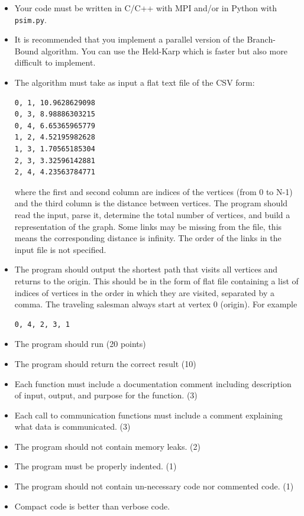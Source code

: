 \documentclass[12pt]{article}
\begin{document}
\begin{itemize}
\item Your code must be written in C/C++ with MPI and/or in Python
  with {\tt psim.py}.
\item It is recommended that you implement a parallel version  of the Branch-Bound algorithm. You can use the Held-Karp which is faster but also more difficult to implement.
\item The algorithm must take as input a flat text file of the CSV form:
\begin{lstlisting}
0, 1, 10.9628629098
0, 3, 8.98886303215
0, 4, 6.65365965779
1, 2, 4.52195982628
1, 3, 1.70565185304
2, 3, 3.32596142881
2, 4, 4.23563784771
\end{lstlisting}
where the first and second column are indices of the vertices (from 0 to N-1) and the third column is the distance between vertices. The program should read the input, parse it, determine the total number of vertices, and build a representation of the graph. Some links may be missing from the file, this means the corresponding distance is infinity. The order of the links in the input file is not specified.
\item The program should output the shortest path that visits all vertices and returns to the origin. This should be in the form of flat file containing a list of indices of vertices in the order in which they are visited, separated by a comma. The traveling salesman always start at vertex 0 (origin). For example
\begin{lstlisting}
0, 4, 2, 3, 1
\end{lstlisting}
\item The program should  run (20 points)
\item The program should return the correct result (10)
\item Each function must include a documentation comment including
  description of input, output, and purpose for the function. (3)
\item Each call to communication functions must include a comment
  explaining what data is communicated. (3)
\item The program should not contain memory leaks. (2)
\item The program must be properly indented. (1)
\item The program should not contain un-necessary code nor commented
  code. (1)
\item Compact code is better than verbose code.
\end{itemize}
\end{document}
